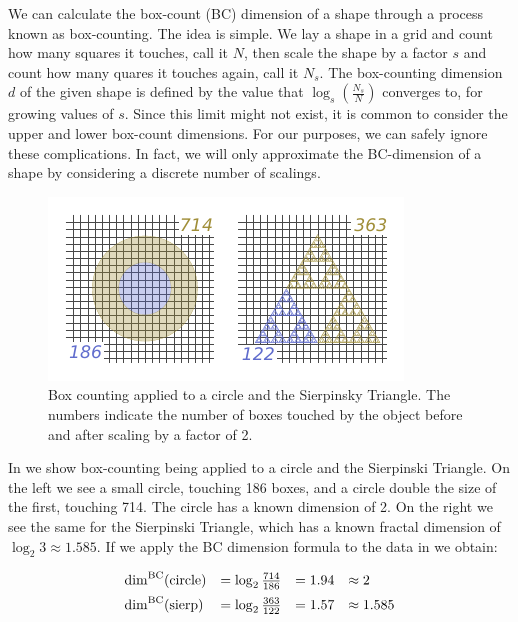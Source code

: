   We can calculate the box-count (BC) dimension of a shape through a
process known as box-counting. The idea is simple. We lay a shape in a
grid and count how many squares it touches, call it $N$, then scale
the shape by a factor $s$ and count how many quares it touches again,
call it $N_s$. The box-counting dimension $d$ of the given shape is
defined by the value that $\log_s(\frac{N_s}{N})$ converges to, for
growing values of $s$.  Since this limit might not exist, it is common
to consider the upper and lower box-count dimensions.  For our
purposes, we can safely ignore these complications. In fact, we will
only approximate the BC-dimension of a shape by considering a discrete
number of scalings. 

\begin{figure}
  \includegraphics[width=\linewidth]{src/img/box-counting-example-alt.pdf}
  \caption{Box counting applied to a circle and the Sierpinsky Triangle. The numbers
indicate the number of boxes touched by the object before and after scaling by a factor of 2.}
  \label{fig:egboxcount}
\end{figure}


In  we show box-counting being applied to a
circle and the Sierpinski Triangle. On the left we see a small circle,
touching 186 boxes, and a circle double the size of the first,
touching 714.  The circle has a known dimension of 2. On the right we
see the same for the Sierpinski Triangle, which has a known fractal
dimension of $\log_2 3 \approx 1.585$.  If we apply the BC dimension
formula to the data in  we obtain:

\[
\begin{array}{l l l l}
  \mathrm{dim}^{\mathrm{BC}} (\mathrm{circle}) &= \log_2{\frac{714}{186}} &= 1.94 &\approx 2 \\[.5em]
  \mathrm{dim}^{\mathrm{BC}} (\mathrm{sierp})  &= \log_2{\frac{363}{122}} &= 1.57 &\approx 1.585 \\
\end{array}
\]

